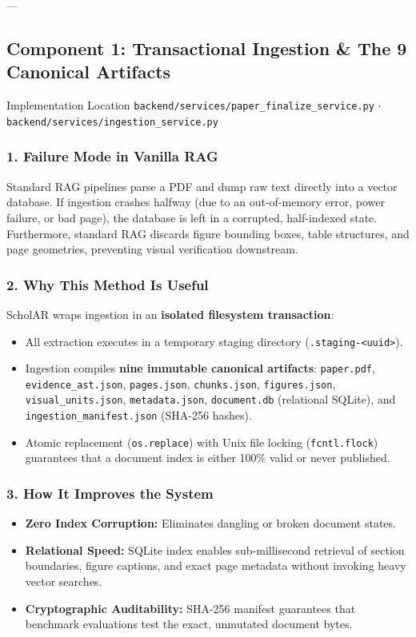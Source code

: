 \documentclass[11pt,a4paper]{article}
\begin{document}
---

\subsection{Component 1: Transactional Ingestion \& The 9 Canonical Artifacts}
\begin{codebox}{Implementation Location}
\texttt{backend/services/paper\_finalize\_service.py} $\cdot$ \texttt{backend/services/ingestion\_service.py}
\end{codebox}

\subsubsection{1. Failure Mode in Vanilla RAG}
Standard RAG pipelines parse a PDF and dump raw text directly into a vector database. If ingestion crashes halfway (due to an out-of-memory error, power failure, or bad page), the database is left in a corrupted, half-indexed state. Furthermore, standard RAG discards figure bounding boxes, table structures, and page geometries, preventing visual verification downstream.

\subsubsection{2. Why This Method Is Useful}
ScholAR wraps ingestion in an \textbf{isolated filesystem transaction}:
\begin{itemize}[leftmargin=*]
    \item All extraction executes in a temporary staging directory (\texttt{.staging-<uuid>}).
    \item Ingestion compiles \textbf{nine immutable canonical artifacts}: \texttt{paper.pdf}, \texttt{evidence\_ast.json}, \texttt{pages.json}, \texttt{chunks.json}, \texttt{figures.json}, \texttt{visual\_units.json}, \texttt{metadata.json}, \texttt{document.db} (relational SQLite), and \texttt{ingestion\_manifest.json} (SHA-256 hashes).
    \item Atomic replacement (\texttt{os.replace}) with Unix file locking (\texttt{fcntl.flock}) guarantees that a document index is either 100\% valid or never published.
\end{itemize}

\subsubsection{3. How It Improves the System}
\begin{itemize}[leftmargin=*]
    \item \textbf{Zero Index Corruption:} Eliminates dangling or broken document states.
    \item \textbf{Relational Speed:} SQLite index enables sub-millisecond retrieval of section boundaries, figure captions, and exact page metadata without invoking heavy vector searches.
    \item \textbf{Cryptographic Auditability:} SHA-256 manifest guarantees that benchmark evaluations test the exact, unmutated document bytes.
\end{itemize}
\end{document}
